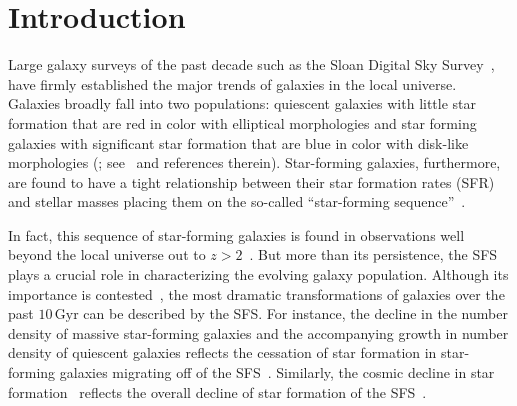 \documentclass[tighten, preprint]{aastex62}
\newcommand{\todo}[1]{{\bf \textcolor{red}{ #1}}}
\begin{document}
\section{Introduction}
Large galaxy surveys of the past decade such as the Sloan Digital Sky 
Survey~\citep[SDSS;][]{york2000}, have firmly established the major 
trends of galaxies in the local universe. Galaxies %
broadly fall into two populations: quiescent galaxies with little star
formation that are red in color with elliptical morphologies and star 
forming galaxies with significant star formation that are blue in color 
with disk-like morphologies 
(\citealt{kauffmann2003, blanton2003, baldry2006, taylor2009, moustakas2013}; 
see~\citealt{blanton2009} and references therein). 
Star-forming galaxies, furthermore, are found to have a tight relationship 
between their star formation rates (SFR) and stellar masses placing them
on the so-called ``star-forming sequence''~\citep[hereafter SFS; \emph{e.g.}][see also Figure~\ref{fig:sfrmstar_sdss}]{noeske2007, daddi2007, salim2007}.


In fact, this sequence of star-forming galaxies is found in observations 
well beyond the local universe out to $z > 2$~\citep{wang2013, leja2015, schreiber2015}.
But more than its persistence, the SFS plays a crucial role in characterizing 
the evolving galaxy population. Although its importance is 
contested~\citep{kelson2014,abramson2016}, the most dramatic transformations 
of galaxies over the past $10\,\mathrm{Gyr}$ can be described by the SFS. 
For instance, the decline in the number density of massive 
star-forming galaxies and the accompanying growth in number density of 
quiescent galaxies reflects the cessation of star formation in 
star-forming galaxies migrating off of the 
SFS~\citep{blanton2006, borch2006, bundy2006, moustakas2013}. 
Similarly, the cosmic decline in star formation~\citep{hopkins2006,
behroozi2013a, madau2014} reflects the overall decline of star 
formation of the SFS~\citep{schreiber2015}. 
\end{document}

